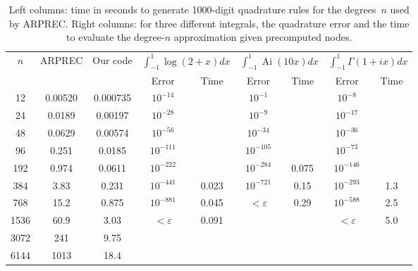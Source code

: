 \documentclass[11pt,a4paper]{article}
\begin{document}
\begin{table}[h!]
\begin{centering}
\begin{tabular}{ c | c c | c c| c c | c c }
$n$ & ARPREC & Our code &
    \multicolumn{2}{|c|}{$\int_{-1}^{1}\!\log(2\!+\!x) dx$} &
    \multicolumn{2}{|c|}{$\int_{-1}^{1}\!\operatorname{Ai}(10 x) dx$} &
    \multicolumn{2}{|c}{$\int_{-1}^{1}\!\Gamma(1\!+\!ix) dx$} \\
   &         &          & Error   & Time      &  Error & Time  &  Error & Time \\ \hline
12 & 0.00520 & 0.000735 & $10^{-14}$ &       &   $10^{-1}$ &  &  $10^{-8}$ & \\
24 & 0.0189 & 0.00197 & $10^{-28}$  &       &  $10^{-9}$  & &  $10^{-17}$ & \\
48 & 0.0629 & 0.00574 & $10^{-56}$ &        &  $10^{-34}$  &    &  $10^{-36}$ & \\
96 & 0.251 & 0.0185 & $10^{-111}$  &         &  $10^{-105}$ &          &  $10^{-73}$ & \\
192 & 0.974 & 0.0611 & $10^{-222}$ &         &  $10^{-284}$ &    0.075      &   $10^{-146}$ & \\
384 & 3.83 & 0.231 & $10^{-441}$  &  0.023        & $10^{-721}$ & 0.15           &   $10^{-293}$ & 1.3 \\
768 & 15.2 & 0.875 & $10^{-881}$ & 0.045      & $<\varepsilon$ & 0.29           &   $10^{-588}$ & 2.5 \\
1536 & 60.9 & 3.03 & $<\varepsilon$ &  0.091     &                &    &            $<\varepsilon$ & 5.0 \\
3072 & 241 & 9.75 &  &  &  &  &  &  \\
6144 & 1013 & 18.4 &  &  &  &  &  &  \\
\end{tabular}
\caption{Left columns: time in seconds to generate 1000-digit
quadrature rules for the degrees~$n$ used by ARPREC.
Right columns: for three different integrals, the quadrature
error
and the time to evaluate the degree-$n$ approximation
given precomputed nodes.}
\label{tab:arprectimings}
\end{centering}
\end{table}
\end{document}
